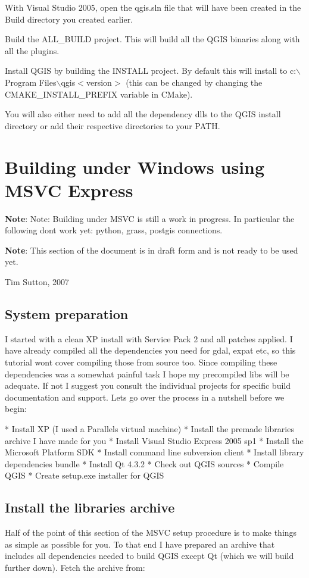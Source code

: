 With Visual Studio 2005, open the qgis.sln file that will have been created in the Build directory you created earlier.

Build the ALL\_BUILD project. This will build all the QGIS binaries along with all the plugins.

 Install QGIS by building the INSTALL project. By default this will install to c:$\backslash$Program Files$\backslash$qgis$<$version$>$ (this can be changed by changing the CMAKE\_INSTALL\_PREFIX variable in CMake). 

 You will also either need to add all the dependency dlls to the QGIS install directory or add their respective directories to your PATH.


\section{Building under Windows using MSVC Express}
\textbf{Note}:   Note: Building under MSVC is still a work in progress. In particular the
following dont work yet: python, grass, postgis connections.

\textbf{Note}: This section of the document is in draft form and is not ready to be used
yet.

Tim Sutton, 2007

\subsection{System preparation}
I started with a clean XP install with Service Pack 2 and all patches applied.
I have already compiled all the dependencies you need for gdal, expat etc,
so this tutorial wont cover compiling those from source too. Since compiling 
these dependencies was a somewhat painful task I hope my precompiled libs 
will be adequate. If not I suggest you consult the individual projects for
specific build documentation and support. Lets go over the process in a nutshell 
before we begin:

 * Install XP (I used a Parallels virtual machine)
 * Install the premade libraries archive I have made for you
 * Install Visual Studio Express 2005 sp1
 * Install the Microsoft Platform SDK
 * Install command line subversion client
 * Install library dependencies bundle
 * Install Qt 4.3.2
 * Check out QGIS sources
 * Compile QGIS
 * Create setup.exe installer for QGIS

\subsection{Install the libraries archive}
Half of the point of this section of the MSVC setup procedure is to make 
things as simple as possible for you. To that end I have prepared an
archive that includes all dependencies needed to build QGIS except Qt 
(which we will build further down). Fetch the archive from:

